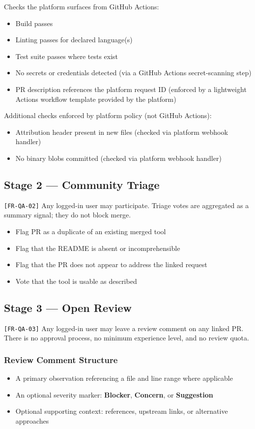 \documentclass[12pt,a4paper]{article}
\begin{document}
Checks the platform surfaces from GitHub Actions:
\begin{itemize}
  \item Build passes
  \item Linting passes for declared language(s)
  \item Test suite passes where tests exist
  \item No secrets or credentials detected (via a GitHub Actions secret-scanning step)
  \item PR description references the platform request ID (enforced by a lightweight Actions workflow template provided by the platform)
\end{itemize}

Additional checks enforced by platform policy (not GitHub Actions):
\begin{itemize}
  \item Attribution header present in new files (checked via platform webhook handler)
  \item No binary blobs committed (checked via platform webhook handler)
\end{itemize}

\subsection{Stage 2 --- Community Triage}
\texttt{[FR-QA-02]} Any logged-in user may participate. Triage votes are aggregated as a summary signal; they do not block merge.
\begin{itemize}
  \item Flag PR as a duplicate of an existing merged tool
  \item Flag that the README is absent or incomprehensible
  \item Flag that the PR does not appear to address the linked request
  \item Vote that the tool is usable as described
\end{itemize}

\subsection{Stage 3 --- Open Review}
\texttt{[FR-QA-03]} Any logged-in user may leave a review comment on any linked PR. There is no approval process, no minimum experience level, and no review quota.

\subsubsection{Review Comment Structure}
\begin{itemize}
  \item A primary observation referencing a file and line range where applicable
  \item An optional severity marker: \textbf{Blocker}, \textbf{Concern}, or \textbf{Suggestion}
  \item Optional supporting context: references, upstream links, or alternative approaches
\end{itemize}
\end{document}
